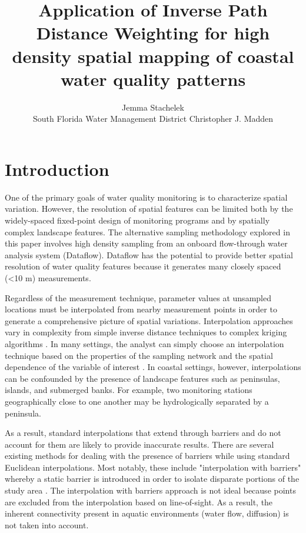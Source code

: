 \documentclass[shortnames,nofooter,noheadings]{jss}
\author{Jemma Stachelek\\   South Florida Water Management District
\And
  Christopher J. Madden}
\title{Application of Inverse Path Distance Weighting for high density spatial mapping of coastal water quality patterns}
\begin{document}

\section[Introduction]{Introduction}
\noindent One of the primary goals of water quality monitoring is to characterize spatial variation. However, the resolution of spatial features can be limited both by the widely-spaced fixed-point design of monitoring programs and by spatially complex landscape features. The alternative sampling methodology explored in this paper involves high density sampling from an onboard flow-through water analysis system (Dataflow). Dataflow \citep{madden1992instrument} has the potential to provide better spatial resolution of water quality features because it generates many closely spaced (<10 m) measurements.

  Regardless of the measurement technique, parameter values at unsampled locations must be interpolated from nearby measurement points in order to generate a comprehensive picture of spatial variations. Interpolation approaches vary in complexity from simple inverse distance techniques to complex kriging algorithms \citep{zimmerman1999experimental}. In many settings, the analyst can simply choose an interpolation technique based on the properties of the sampling network and the spatial dependence of the variable of interest \citep{isaaks1989applied}. In coastal settings, however, interpolations can be confounded by the presence of landscape features such as peninsulas, islands, and submerged banks.  For example, two monitoring stations geographically close to one another may be hydrologically separated by a peninsula. 

  As a result, standard interpolations that extend through barriers and do not account for them are likely to provide inaccurate results. There are several existing methods for dealing with the presence of barriers while using standard Euclidean interpolations. Most notably, these include "interpolation with barriers" whereby a static barrier is introduced in order to isolate disparate portions of the study area \citep{krivoruchko2004geostatistical,soderqvist2010seasonal}. The interpolation with barriers approach is not ideal because points are excluded from the interpolation based on line-of-sight. As a result, the inherent connectivity present in aquatic environments (water flow, diffusion) is not taken into account. 
\end{document}
